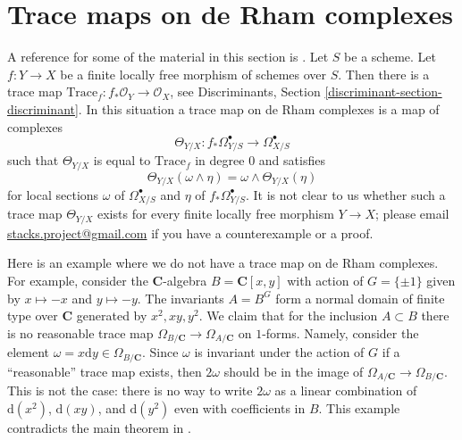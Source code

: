 







\section{Trace maps on de Rham complexes}
\label{section-trace}

\noindent
A reference for some of the material in this section is \cite{Garel}.
Let $S$ be a scheme. Let $f : Y \to X$ be a finite locally free morphism
of schemes over $S$. Then there is a trace map
$\text{Trace}_f : f_*\mathcal{O}_Y \to \mathcal{O}_X$, see
Discriminants, Section \ref{discriminant-section-discriminant}.
In this situation a trace map on de Rham complexes is a map
of complexes
$$
\Theta_{Y/X} : f_*\Omega^\bullet_{Y/S} \longrightarrow \Omega^\bullet_{X/S}
$$
such that $\Theta_{Y/X}$ is equal to $\text{Trace}_f$ in degree $0$
and satisfies
$$
\Theta_{Y/X}(\omega \wedge \eta) = \omega \wedge \Theta_{Y/X}(\eta)
$$
for local sections $\omega$ of $\Omega^\bullet_{X/S}$ and $\eta$
of $f_*\Omega^\bullet_{Y/S}$. It is not clear to us whether such a trace map
$\Theta_{Y/X}$ exists for every finite locally free morphism $Y \to X$;
please email
\href{mailto:stacks.project@gmail.com}{stacks.project@gmail.com}
if you have a counterexample or a proof.

\begin{example}
\label{example-no-trace}
Here is an example where we do not have a trace map on de Rham complexes.
For example, consider the $\mathbf{C}$-algebra $B = \mathbf{C}[x, y]$ with
action of $G = \{\pm 1\}$ given by $x \mapsto -x$ and $y \mapsto -y$.
The invariants $A = B^G$ form a normal domain of finite type over $\mathbf{C}$
generated by $x^2, xy, y^2$. We claim that for the inclusion $A \subset B$
there is no reasonable trace map
$\Omega_{B/\mathbf{C}} \to \Omega_{A/\mathbf{C}}$
on $1$-forms. Namely, consider the element
$\omega = x \text{d} y \in \Omega_{B/\mathbf{C}}$.
Since $\omega$ is invariant under the action of $G$ if a ``reasonable''
trace map exists, then $2\omega$ should be in the image of
$\Omega_{A/\mathbf{C}} \to \Omega_{B/\mathbf{C}}$. This is
not the case: there is no way to write $2\omega$ as a linear
combination of $\text{d}(x^2)$, $\text{d}(xy)$, and $\text{d}(y^2)$
even with coefficients in $B$.
This example contradicts the main theorem in
\cite{Zannier}.
\end{example}

